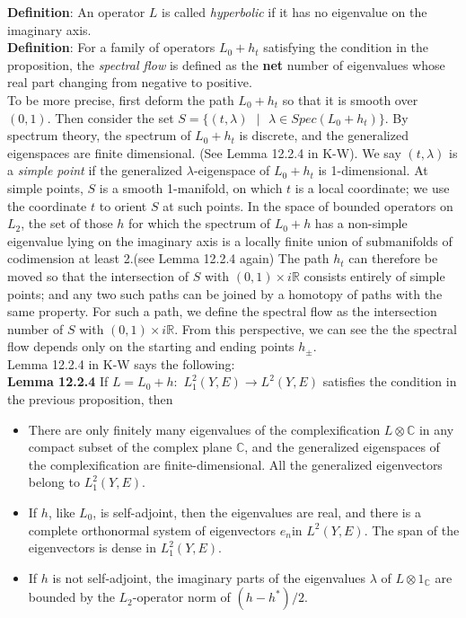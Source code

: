 		\textbf{Definition}: An operator $L$ is called \textit{hyperbolic} if it has no eigenvalue on the imaginary axis.\\
		\vspace{5mm}
		\textbf{Definition}: For a family of operators $L_0+h_t$ satisfying the condition in the proposition, the \textit{spectral flow} is defined as the \textbf{net} number of eigenvalues whose real part changing from negative to positive. \\
		\vspace{5mm }To be more precise, first deform the path $L_0 + h_t$ so that it is smooth over $(0,1)$. Then consider the set $S = \{(t,\lambda)\text{ } | \text{ }\lambda \in Spec(L_0+h_t)\}$. By spectrum theory, the spectrum of $L_0+h_t$ is discrete, and the generalized eigenspaces are finite dimensional. (See Lemma 12.2.4 in K-W). We say $(t,\lambda)$ is a \textit{simple point} if the generalized $\lambda$-eigenspace of $L_0+h_t$ is 1-dimensional. At simple points, $S$ is a smooth 1-manifold, on which $t$ is a local coordinate; we use the coordinate $t$ to orient $S$ at such points. In the space of bounded operators on $L_2$, the set of those $h$ for which the spectrum of $L_0+h$ has a non-simple eigenvalue lying on the imaginary axis is a locally finite union of submanifolds of codimension at least 2.(see Lemma 12.2.4 again) The path $h_t$ can therefore be moved so that the intersection of $S$ with $(0, 1)\times i\mathbb{R}$ consists entirely of simple points; and any two such paths can be joined by a homotopy of paths with the same property. For such a path, we define the spectral flow as the intersection number of $S$ with $(0, 1)\times i\mathbb{R}$. From this perspective, we can see the the spectral flow depends only on the starting and ending points $h_{\pm}$. \\
		\vspace{5mm}
		Lemma 12.2.4 in K-W says the following: \\
		\vspace{5mm}
		\textbf{Lemma 12.2.4} If $L=L_0+h:$  $L^2_1(Y,E) \rightarrow L^2(Y,E)$ satisfies the condition in the previous proposition, then 
		\begin{itemize}
		    \item There  are  only  finitely  many  eigenvalues  of  the  complexification  $L\otimes {\mathbb{C}}$ in  any  compact  subset  of  the  complex  plane $\mathbb{C}$,  and  the  generalized  eigenspaces  of  the  complexification  are  finite-dimensional. All  the generalized eigenvectors belong to $L^2_1(Y,E)$.
		    \item If $h$, like $L_0$, is self-adjoint, then the eigenvalues are real, and there is a complete orthonormal system of eigenvectors ${e_n}$in $L^2(Y,E)$. The span of the eigenvectors is dense in $L^2_1(Y,E)$.
		    \item If $h$ is not self-adjoint, the imaginary parts of the eigenvalues $\lambda$ of $L\otimes 1_{\mathbb{C}}$ are bounded by the $L_2$-operator norm of $(h-h^*)/2$.
		\end{itemize}

